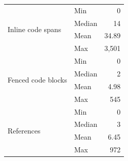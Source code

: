 \begin{table}[t]
\begin{tabular}{llr}
\multirow{4}{*}{Inline code spans}
& Min    & 0         \\
& Median & 14        \\
& Mean   & 34.89     \\
& Max    & 3,501     \\
\midrule

\multirow{4}{*}{Fenced code blocks}
& Min    & 0         \\
& Median & 2         \\
& Mean   & 4.98      \\
& Max    & 545       \\
\midrule

\multirow{4}{*}{References}
& Min    & 0         \\
& Median & 3         \\
& Mean   & 6.45      \\
& Max    & 972       \\
\bottomrule
\end{tabular}
\end{table}
